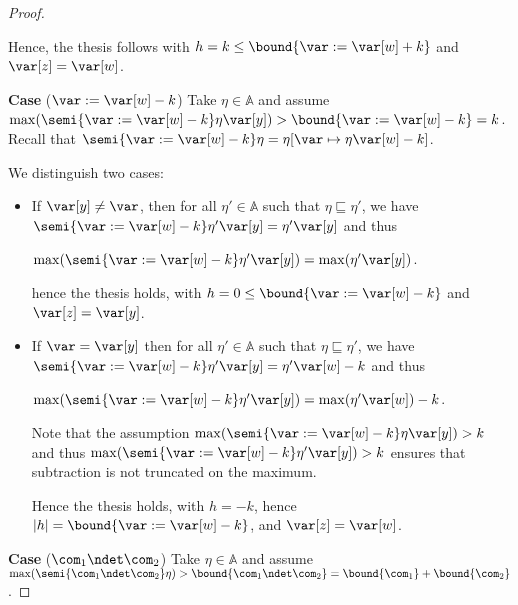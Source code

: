 \begin{proof}
\begin{itemize}
    Hence, the thesis follows with \(h = k \leq \bound{\var := \var[w] + k}\)
    and \(\var[z] = \var[w]\).
  \end{itemize}

  
  \medskip
  
  \noindent
  \textbf{Case} (\(\var := \var[w] - k\))
  Take \(\eta \in \mathbb{A}\) and assume
  \(\max(\semi{\var := \var[w] - k}\eta \var[y]) > \bound{\var := \var[w] - k} = k\).
  Recall that
  \(\semi{\var := \var[w] - k}\eta = \eta[\var \mapsto \eta \var[w] - k]\).
  
  We distinguish two cases:
  \begin{itemize}
    
  \item If \(\var[y] \neq \var\), then for all
    \(\eta' \in \mathbb{A}\) such that
    \(\eta \sqsubseteq \eta'\), we have
    \(\semi{\var := \var[w] - k}\eta' \var[y] = \eta' \var[y]\) and thus
    \begin{center}
      \(\max(\semi{\var := \var[w] - k}\eta' \var[y]) = \max(\eta' \var[y])\).
    \end{center}
    hence the thesis holds, with
    \(h =0 \leq \bound{\var := \var[w] - k}\) and \(\var[z] = \var[y]\).
    
  \item If \(\var = \var[y]\) then for all \(\eta' \in \mathbb{A}\) such
    that \(\eta \sqsubseteq \eta'\), we have
    \(\semi{\var := \var[w] - k}\eta' \var[y] = \eta' \var[w] - k\) and
    thus
    \begin{center}
      \(\max(\semi{\var := \var[w] - k}\eta' \var[y]) = \max(\eta' \var[w]) -
      k\).
    \end{center}
    Note that the assumption \(\max(\semi{\var := \var[w] - k}\eta \var[y]) > k\) and thus
    \(\max(\semi{\var := \var[w] - k}\eta' \var[y]) > k\) ensures that subtraction is not
    truncated on the maximum.
    
    Hence the thesis holds, with \(h = -k\), hence \(|h| = \bound{\var := \var[w] - k}\),
    and \(\var[z] = \var[w]\).
  \end{itemize}
  
  
  \medskip
  
  \noindent
  \textbf{Case} (\(\com_1 \ndet \com_2\))
  Take \(\eta \in \mathbb{A}\) and assume
  \(\max(\semi{\com_1 \ndet \com_2}\eta) > \bound{\com_1 \ndet \com_2} =
  \bound{\com_1} + \bound{\com_2}\).


\end{proof}
